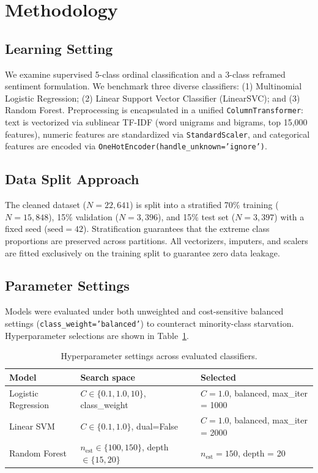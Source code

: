 \documentclass[10pt,conference,a4paper]{IEEEtran}
\begin{document}
\section{Methodology}
\subsection{Learning Setting}
We examine supervised 5-class ordinal classification and a 3-class reframed sentiment formulation. We benchmark three diverse classifiers: (1) Multinomial Logistic Regression; (2) Linear Support Vector Classifier (LinearSVC); and (3) Random Forest. Preprocessing is encapsulated in a unified \texttt{ColumnTransformer}: text is vectorized via sublinear TF-IDF (word unigrams and bigrams, top 15,000 features), numeric features are standardized via \texttt{StandardScaler}, and categorical features are encoded via \texttt{OneHotEncoder(handle\_unknown='ignore')}.

\subsection{Data Split Approach}
The cleaned dataset ($N = 22,641$) is split into a stratified 70\% training ($N = 15,848$), 15\% validation ($N = 3,396$), and 15\% test set ($N = 3,397$) with a fixed seed ($\text{seed} = 42$). Stratification guarantees that the extreme class proportions are preserved across partitions. All vectorizers, imputers, and scalers are fitted exclusively on the training split to guarantee zero data leakage.

\subsection{Parameter Settings}
Models were evaluated under both unweighted and cost-sensitive balanced settings (\texttt{class\_weight='balanced'}) to counteract minority-class starvation. Hyperparameter selections are shown in Table~\ref{tab:hyperparams}.

\begin{table}[htbp]
\centering
\caption{Hyperparameter settings across evaluated classifiers.}
\label{tab:hyperparams}
\begin{tabular}{lll}
\toprule
\textbf{Model} & \textbf{Search space} & \textbf{Selected} \\
\midrule
Logistic Regression & $C \in \{0.1, 1.0, 10\}$, class\_weight & $C = 1.0$, balanced, max\_iter = 1000 \\
Linear SVM & $C \in \{0.1, 1.0\}$, dual=False & $C = 1.0$, balanced, max\_iter = 2000 \\
Random Forest & $n_{\text{est}} \in \{100, 150\}$, depth $\in \{15, 20\}$ & $n_{\text{est}} = 150$, depth = 20 \\
\bottomrule
\end{tabular}
\end{table}
\end{document}
